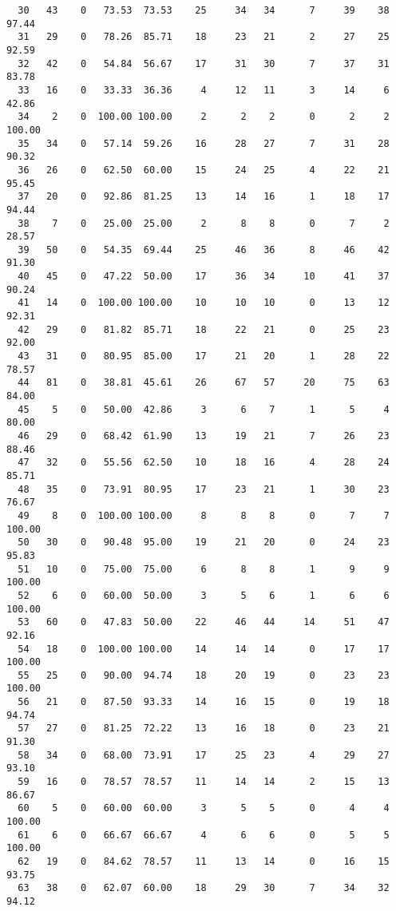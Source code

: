 \begin{verbatim}
  30   43    0   73.53  73.53    25     34   34      7     39    38    97.44
  31   29    0   78.26  85.71    18     23   21      2     27    25    92.59
  32   42    0   54.84  56.67    17     31   30      7     37    31    83.78
  33   16    0   33.33  36.36     4     12   11      3     14     6    42.86
  34    2    0  100.00 100.00     2      2    2      0      2     2   100.00
  35   34    0   57.14  59.26    16     28   27      7     31    28    90.32
  36   26    0   62.50  60.00    15     24   25      4     22    21    95.45
  37   20    0   92.86  81.25    13     14   16      1     18    17    94.44
  38    7    0   25.00  25.00     2      8    8      0      7     2    28.57
  39   50    0   54.35  69.44    25     46   36      8     46    42    91.30
  40   45    0   47.22  50.00    17     36   34     10     41    37    90.24
  41   14    0  100.00 100.00    10     10   10      0     13    12    92.31
  42   29    0   81.82  85.71    18     22   21      0     25    23    92.00
  43   31    0   80.95  85.00    17     21   20      1     28    22    78.57
  44   81    0   38.81  45.61    26     67   57     20     75    63    84.00
  45    5    0   50.00  42.86     3      6    7      1      5     4    80.00
  46   29    0   68.42  61.90    13     19   21      7     26    23    88.46
  47   32    0   55.56  62.50    10     18   16      4     28    24    85.71
  48   35    0   73.91  80.95    17     23   21      1     30    23    76.67
  49    8    0  100.00 100.00     8      8    8      0      7     7   100.00
  50   30    0   90.48  95.00    19     21   20      0     24    23    95.83
  51   10    0   75.00  75.00     6      8    8      1      9     9   100.00
  52    6    0   60.00  50.00     3      5    6      1      6     6   100.00
  53   60    0   47.83  50.00    22     46   44     14     51    47    92.16
  54   18    0  100.00 100.00    14     14   14      0     17    17   100.00
  55   25    0   90.00  94.74    18     20   19      0     23    23   100.00
  56   21    0   87.50  93.33    14     16   15      0     19    18    94.74
  57   27    0   81.25  72.22    13     16   18      0     23    21    91.30
  58   34    0   68.00  73.91    17     25   23      4     29    27    93.10
  59   16    0   78.57  78.57    11     14   14      2     15    13    86.67
  60    5    0   60.00  60.00     3      5    5      0      4     4   100.00
  61    6    0   66.67  66.67     4      6    6      0      5     5   100.00
  62   19    0   84.62  78.57    11     13   14      0     16    15    93.75
  63   38    0   62.07  60.00    18     29   30      7     34    32    94.12

\end{verbatim}
